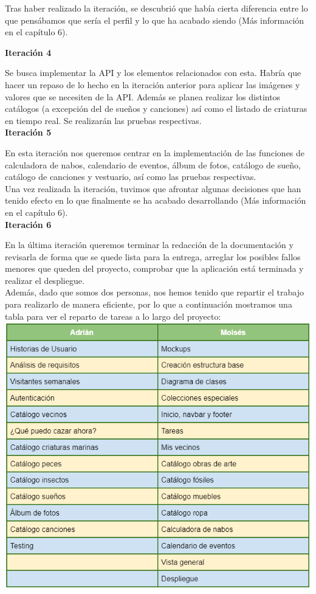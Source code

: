 Tras haber realizado la iteración, se descubrió que había cierta diferencia entre lo que pensábamos que sería el perfil y lo que ha acabado siendo (Más información en el capítulo 6).\\

\clearpage

\textbf{Iteración 4}

Se busca implementar la API y los elementos relacionados con esta. Habría que hacer un repaso de lo hecho en la iteración anterior para aplicar las imágenes y valores que se necesiten de la API. Además se planea realizar los distintos catálogos (a excepción del de sueños y canciones) así como el listado de criaturas en tiempo real. Se realizarán las pruebas respectivas.\\

\textbf{Iteración 5}

En esta iteración nos queremos centrar en la implementación de las funciones de calculadora de nabos, calendario de eventos, álbum de fotos, catálogo de sueño, catálogo de canciones y vestuario, así como las pruebas respectivas.\\

Una vez realizada la iteración, tuvimos que afrontar algunas decisiones que han tenido efecto en lo que finalmente se ha acabado desarrollando (Más información en el capítulo 6).\\

\textbf{Iteración 6}

En la última iteración queremos terminar la redacción de la documentación y revisarla de forma que se quede lista para la entrega, arreglar los posibles fallos menores que queden del proyecto, comprobar que la aplicación está terminada y realizar el despliegue.\\

Además, dado que somos dos personas, nos hemos tenido que repartir el trabajo para realizarlo de manera eficiente, por lo que a continuación mostramos una tabla para ver el reparto de tareas a lo largo del proyecto:\\

\includegraphics[width=\textwidth]{img/cap4/repartotareas.png}\\

